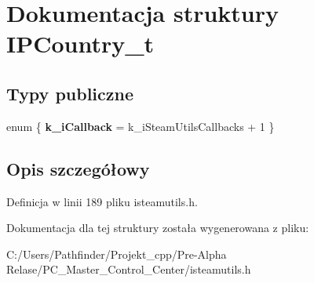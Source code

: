 \hypertarget{struct_i_p_country__t}{}\section{Dokumentacja struktury I\+P\+Country\+\_\+t}
\label{struct_i_p_country__t}
\subsection*{Typy publiczne}
\begin{DoxyCompactItemize}
\item 
\mbox{\label{struct_i_p_country__t_ae28c6e8000f39b1473ee9de1f8555531}} 
enum \{ {\bfseries k\+\_\+i\+Callback} = k\+\_\+i\+Steam\+Utils\+Callbacks + 1
 \}
\end{DoxyCompactItemize}


\subsection{Opis szczegółowy}


Definicja w linii 189 pliku isteamutils.\+h.



Dokumentacja dla tej struktury została wygenerowana z pliku\+:\begin{DoxyCompactItemize}
\item 
C\+:/\+Users/\+Pathfinder/\+Projekt\+\_\+cpp/\+Pre-\/\+Alpha Relase/\+P\+C\+\_\+\+Master\+\_\+\+Control\+\_\+\+Center/isteamutils.\+h\end{DoxyCompactItemize}
